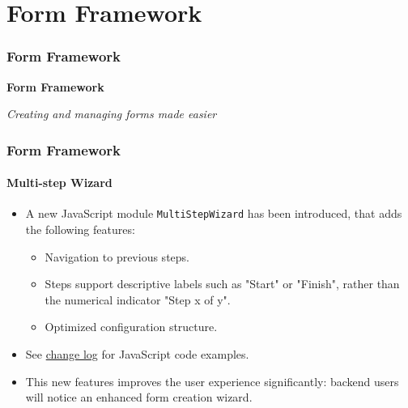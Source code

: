 %

\section{Form Framework}
\begin{frame}[fragile]
	\frametitle{Form Framework}

	\begin{center}\huge{\color{typo3darkgrey}\textbf{Form Framework}}\end{center}
	\begin{center}\large{\textit{Creating and managing forms made easier}}\end{center}

\end{frame}


\begin{frame}[fragile]
	\frametitle{Form Framework}
	\framesubtitle{Multi-step Wizard}

	\begin{itemize}
		\item A new JavaScript module \texttt{MultiStepWizard} has been introduced,
			that adds the following features:

			\begin{itemize}
				\item Navigation to previous steps.
				\item Steps support descriptive labels such as "Start" or "Finish", rather than the numerical indicator "Step x of y".
				\item Optimized configuration structure.
			\end{itemize}

		\item See \href{https://docs.typo3.org/c/typo3/cms-core/master/en-us/Changelog/10.2/Feature-79445-AddMultistepWizard.html}{change log}
			for JavaScript code examples.

		\item This new features improves the user experience significantly: backend users will notice an enhanced form creation wizard.

	\end{itemize}

\end{frame}

